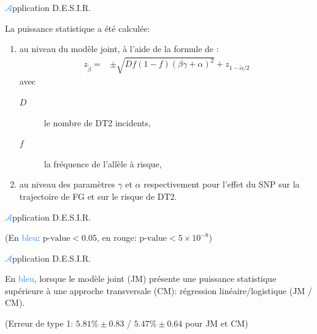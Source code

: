 \begin{frame}{{\huge\textcolor{dodgerblue}{$\mathcal{A}$}}pplication D.E.S.I.R.}{}
\par{La puissance statistique a été calculée:
\vspace{1em}
\begin{enumerate}
    \item au niveau du modèle joint, à l'aide de la formule de \textcolor{dodgerblue}{\citet{chen_sample_2011}}:
{\scriptsize \textcolor{springgreen3}{\begin{eqnarray}z_{\tilde{\beta}}=&\pm\sqrt{Df(1-f)(\beta\gamma+\alpha)^2}+z_{1-\tilde{\alpha}/2}\nonumber\end{eqnarray}}}
avec\vspace{-1em}
\begin{description}
    \item[\textcolor{springgreen3}{$D$}] le nombre de \textcolor{springgreen3}{DT2} incidents,
    \item[\textcolor{springgreen3}{$f$}] la fréquence de l'allèle à risque,
\end{description}
\vspace{1em}
    \item au niveau des paramètres \textcolor{springgreen3}{$\gamma$} et \textcolor{springgreen3}{$\alpha$} respectivement pour l'effet du SNP sur la trajectoire de \textcolor{springgreen3}{FG} et sur le risque de \textcolor{springgreen3}{DT2}.
\end{enumerate}
}
\end{frame}


\begin{frame}{{\huge\textcolor{dodgerblue}{$\mathcal{A}$}}pplication D.E.S.I.R.}{}
\begin{center}
    
    \par{\scriptsize (En \textcolor{dodgerblue}{bleu}: $\textrm{p-value}<0.05$, en \textcolor{firebrick2}{rouge}: $\textrm{p-value}<5\times 10^{-8}$)}
\end{center}
\end{frame}

\begin{frame}{{\huge\textcolor{dodgerblue}{$\mathcal{A}$}}pplication D.E.S.I.R.}{}
\par{En \textcolor{dodgerblue}{bleu}, lorsque le modèle joint (\textcolor{springgreen3}{JM}) présente une puissance statistique supérieure à une approche transversale (CM): régression linéaire/logistique (\textcolor{springgreen3}{JM} / \textcolor{springgreen3}{CM}).}
\begin{center}
    
    \par{\scriptsize (Erreur de type 1: $5.81\%\pm0.83$ / $5.47\%\pm0.64$ pour \textcolor{springgreen3}{JM} et \textcolor{springgreen3}{CM})}
\end{center}
\end{frame}


